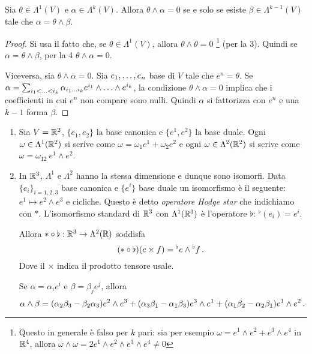 \begin{corollary}
	Sia $\theta\in\Lambda^1(V)$ e $\alpha\in\Lambda^k(V)$. Allora $\theta\wedge\alpha=0$ se e solo se esiste $\beta\in\Lambda^{k-1}(V)$ tale che $\alpha = \theta \wedge \beta$.
\end{corollary}
\begin{proof}
	Si usa il fatto che, se $\theta\in\Lambda^1(V)$, allora $\theta\wedge\theta=0$ \footnote{Questo in generale è falso per $k$ pari: sia per esempio $\omega=e^1\wedge e^2+e^3\wedge e^4$ in $\R^4$, allora $\omega\wedge\omega = 2e^1\wedge e^2 \wedge e^3\wedge e^4 \not=0$} (per la 3).
	Quindi se $\alpha=\theta\wedge\beta$, per la 4 $\theta\wedge\alpha=0$.
	
	Viceversa, sia $\theta\wedge\alpha=0$. Sia $\seqb en,$ base di $V$ tale che $e^n=\theta$. Se $\alpha=\sum_{i_1<\ldots<i_k} \alpha_{\seqb ik{}} e^{i_1}\wedge\ldots\wedge e^{i_k}$, la condizione $\theta\wedge\alpha=0$ implica che i coefficienti in cui $e^n$ non compare sono nulli. Quindi $\alpha$ si fattorizza con $e^n$ e una $k-1$ forma $\beta$.
\end{proof}

\begin{example}
	\begin{enumerate}
		\item Sia $V = \R^2$, $\{e_1,e_2\}$ la base canonica e $\{e^1,e^2\}$ la base duale. Ogni $\omega\in\Lambda^1(\R^2)$ si scrive come $\omega = \omega_1e^1+\omega_2e^2$ e ogni $\omega\in\Lambda^2(\R^2)$ si scrive come $\omega = \omega_{12}\ e^1\wedge e^2$. 
		
		\item In $\R^3$, $\Lambda^1$ e $\Lambda^2$ hanno la stessa dimensione e dunque sono isomorfi. Data $\{e_i\}_{i=1,2,3}$ base canonica e $\{e^i\}$ base duale un isomorfismo è il seguente: $e^1\mapsto e^2\wedge e^3$ e cicliche.
		Questo è detto \emph{operatore Hodge star} che indichiamo con $*$. L'isomorfismo standard di $\R^3$ con $\Lambda^1(\R^3)$ è l'operatore $\flat$: $^\flat(e_i) = e^i$.
		
		Allora $*\circ \flat:\R^3\to \Lambda^2(\R)$ soddisfa
		\begin{equation*}
			(*\circ \flat) (e\times f) = {^\flat e} \wedge {^\flat f}\punto 
		\end{equation*}
		Dove il $\times$ indica il prodotto tensore usale.
		
		Se $\alpha = \alpha_ie^i$ e $\beta = \beta_j e^j$, allora
		\begin{equation*}
			\alpha\wedge\beta = (\alpha_2\beta_3 - \beta_2\alpha_3)e^2\wedge e^3 + (\alpha_3\beta_1 - \alpha_1\beta_3)e^3\wedge e^1 + (\alpha_1\beta_2 - \alpha_2\beta_1) e^1\wedge e^2 \punto
		\end{equation*}
	\end{enumerate}
\end{example}

